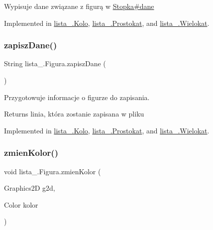 Wypisuje dane związane z figurą w \mbox{\hyperlink{classlista__5_1_1_stopka_a8e8ef21758defd5b137e609b00d2f59e}{Stopka\#dane}} 

Implemented in \mbox{\hyperlink{classlista__5_1_1_kolo_a9b453810cf6823d1f2549f85419aa5a7}{lista\+\_.\+Kolo}}, \mbox{\hyperlink{classlista__5_1_1_prostokat_a95b9ce7b2a7b095c43ffc843cfeff39a}{lista\+\_.\+Prostokat}}, and \mbox{\hyperlink{classlista__5_1_1_wielokat_ad1df79cd3736bb0fcf3ba2252409f3f8}{lista\+\_.\+Wielokat}}.

\mbox{\label{interfacelista__5_1_1_figura_a9d60d64b495755a3e48a3eee549a728d}} 
\subsubsection{\texorpdfstring{zapisz\+Dane()}{zapiszDane()}}
{\footnotesize\ttfamily String lista\+\_.\+Figura.\+zapisz\+Dane (\begin{DoxyParamCaption}{ }\end{DoxyParamCaption})}

Przygotowuje informacje o figurze do zapisania. \begin{DoxyReturn}{Returns}
linia, która zostanie zapisana w pliku 
\end{DoxyReturn}


Implemented in \mbox{\hyperlink{classlista__5_1_1_kolo_ab812bc5ce875bf87c7c4268d4f1c8aa2}{lista\+\_.\+Kolo}}, \mbox{\hyperlink{classlista__5_1_1_prostokat_a9537add38b8302420692068fb36726b5}{lista\+\_.\+Prostokat}}, and \mbox{\hyperlink{classlista__5_1_1_wielokat_a6391ebe6bc42d42b6bd3041b1a6bd7bd}{lista\+\_.\+Wielokat}}.

\mbox{\label{interfacelista__5_1_1_figura_aeb0982dc44348dd1fde9266d9d476ed0}} 
\subsubsection{\texorpdfstring{zmien\+Kolor()}{zmienKolor()}}
{\footnotesize\ttfamily void lista\+\_.\+Figura.\+zmien\+Kolor (\begin{DoxyParamCaption}\item[{Graphics2D}]{g2d,  }\item[{Color}]{kolor }\end{DoxyParamCaption})}

